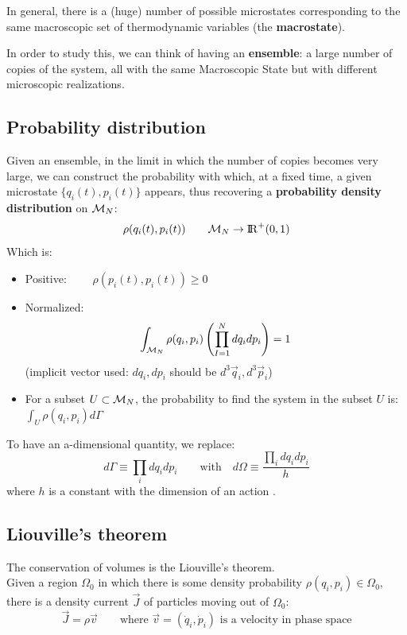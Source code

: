 In general, there is a (huge) number of possible microstates corresponding to the same macroscopic set of thermodynamic variables (the \textbf{macrostate}).

In order to study this, we can think of having an \textbf{ensemble}: a large number of copies of the system, all with the same Macroscopic State but with different microscopic realizations.

\subsection{Probability distribution}
Given an ensemble, in the limit in which the number of copies becomes very large, we can construct the probability with which, at a fixed time, a given microstate $\{q_i(t), p_i(t)\}$ appears, thus recovering a \textbf{probability density distribution} on $\mathcal{M}_N$:
$$\rho(q_i(t), p_i(t)) \qquad \mathcal{M}_N \to {\rm I\!R}^+ (0,1)$$
Which is:
\begin{itemize}
    \item Positive: $\qquad \rho (p_i(t), p_i(t)) \ge 0 $
    \item Normalized: $$ \int_{\mathcal{M}_N}\rho(q_i,p_i) \left(\prod_{I=1}^N dq_i dp_i\right) = 1$$
    (implicit vector used: $dq_i, dp_i$ should be $d^3\vec q_i, d^3 \vec p_i$)
    \item For a subset $U \subset \mathcal{M}_N$, the probability to find the system in the subset $U$ is: $\int_U \rho(q_i,p_i) d\Gamma$
\end{itemize}

\hspace{0pt}

To have an a-dimensional quantity, we replace: 
$$ d\Gamma \equiv \prod_i dq_i dp_i \qquad \text{with}\quad  d\Omega \equiv \frac{\prod_i dq_i dp_i}h $$
where $h$ is a constant with the dimension of an action .

\subsection{Liouville's theorem}
The conservation of volumes is the Liouville's theorem.\\Given a region $\Omega_0$ in which there is some density probability $\rho(q_i,p_i) \in \Omega_0$, there is a density current $\vec J$ of particles moving out of $\Omega_0$:
$$ \vec J = \rho \vec v \qquad \text{where } \vec v = (\dot q_i, \dot p_i) \text{ is a velocity in phase space}$$

